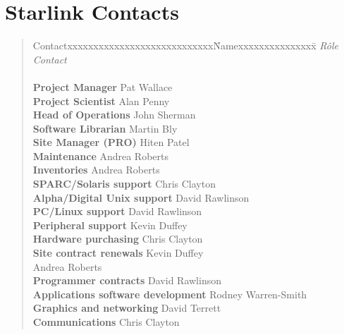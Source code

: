 \documentclass[twoside,11pt]{article}
\begin{document}
\appendix

\newpage

\section {\label{starlinkcontacts}Starlink Contacts}

\begin{quote}
\begin{tabbing}
Contactxxxxxxxxxxxxxxxxxxxxxxxxxxxx\=Namexxxxxxxxxxxxxxx\=\kill
{\em R\^{o}le}                   \> {\em Contact}  \\
\\
{\bf Project Manager}            \> Pat Wallace     \\
{\bf Project Scientist}          \> Alan Penny      \\
{\bf Head of Operations}         \> John Sherman    \\
{\bf Software Librarian}         \> Martin Bly      \\
{\bf Site Manager (PRO)}         \> Hiten Patel     \\
{\bf Maintenance}                \> Andrea Roberts  \\
{\bf Inventories}                \> Andrea Roberts  \\
{\bf SPARC/Solaris support}      \> Chris Clayton   \\
{\bf Alpha/Digital Unix support} \> David Rawlinson \\
{\bf PC/Linux support}           \> David Rawlinson \\
{\bf Peripheral support}         \> Kevin Duffey    \\
{\bf Hardware purchasing}        \> Chris Clayton   \\
{\bf Site contract renewals}     \> Kevin Duffey    \\
                                 \> Andrea Roberts  \\
{\bf Programmer contracts}        \> David Rawlinson  \\
{\bf Applications software development}\> Rodney Warren-Smith  \\
{\bf Graphics and networking}    \> David Terrett   \\
{\bf Communications}             \> Chris Clayton  
\end{tabbing}
\end{quote}
\end{document}
